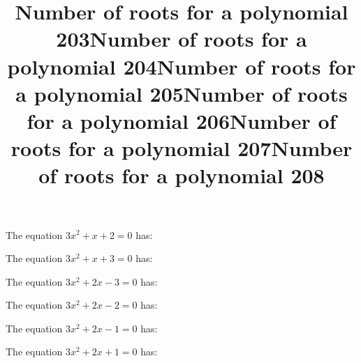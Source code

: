 \documentclass{article}
\begin{document}
\begin{category}
\begin{question}[multichoice]


\end{question}
\begin{question}[multichoice]
\title{Number of roots for a polynomial 203}
The equation $3 x^{2} + x + 2=0$ has:



\end{question}
\begin{question}[multichoice]
\title{Number of roots for a polynomial 204}
The equation $3 x^{2} + x + 3=0$ has:



\end{question}
\begin{question}[multichoice]
\title{Number of roots for a polynomial 205}
The equation $3 x^{2} + 2 x - 3=0$ has:



\end{question}
\begin{question}[multichoice]
\title{Number of roots for a polynomial 206}
The equation $3 x^{2} + 2 x - 2=0$ has:



\end{question}
\begin{question}[multichoice]
\title{Number of roots for a polynomial 207}
The equation $3 x^{2} + 2 x - 1=0$ has:



\end{question}
\begin{question}[multichoice]
\title{Number of roots for a polynomial 208}
The equation $3 x^{2} + 2 x + 1=0$ has:




\end{question}
\end{category}
\end{document}
